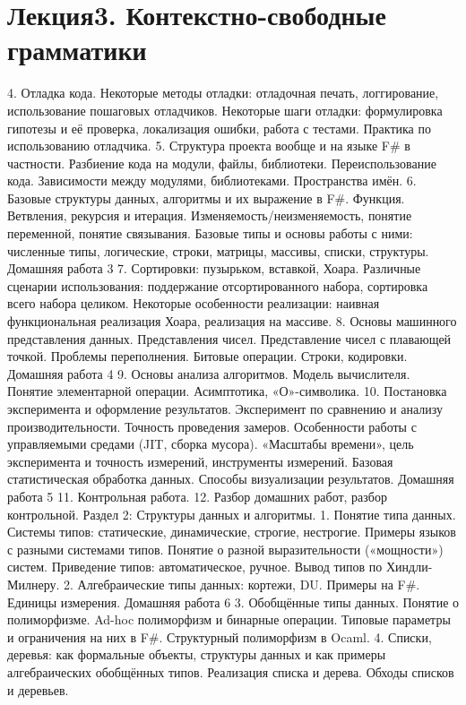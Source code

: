 \section{Лекция3. Контекстно-свободные грамматики}

    4. Отладка кода. Некоторые методы отладки: отладочная печать, логгирование, использование пошаговых отладчиков. Некоторые шаги отладки: формулировка гипотезы и её проверка, локализация ошибки, работа с тестами. Практика по использованию отладчика.
    5. Структура проекта вообще и на языке F# в частности. Разбиение кода на модули, файлы, библиотеки. Переиспользование кода. Зависимости между модулями, библиотеками. Пространства имён.
    6. Базовые структуры данных, алгоритмы и их выражение в F#. Функция. Ветвления, рекурсия и итерация. Изменяемость/неизменяемость, понятие переменной, понятие связывания. Базовые типы и основы работы с ними: численные типы, логические, строки, матрицы, массивы, списки, структуры. 
Домашняя работа 3
    7. Сортировки: пузырьком, вставкой, Хоара. Различные сценарии использования: поддержание отсортированного набора, сортировка всего набора целиком. Некоторые особенности реализации: наивная функциональная реализация Хоара, реализация на массиве.
    8. Основы машинного представления данных. Представления чисел. Представление чисел с плавающей точкой. Проблемы переполнения. Битовые операции. Строки, кодировки.
Домашняя работа 4
    9. Основы анализа алгоритмов. Модель вычислителя. Понятие элементарной операции. Асимптотика, «О»-символика.
    10. Постановка эксперимента и оформление результатов. Эксперимент по сравнению и анализу производительности.  Точность проведения замеров. Особенности работы с управляемыми средами (JIT, сборка мусора). «Масштабы времени», цель эксперимента и точность измерений, инструменты измерений. Базовая статистическая обработка данных. Способы визуализации результатов.  
Домашняя работа 5
    11. Контрольная работа.
    12. Разбор домашних работ, разбор контрольной.
Раздел 2: Структуры данных и алгоритмы.
    1. Понятие типа данных. Системы типов: статические, динамические, строгие, нестрогие. Примеры языков с разными системами типов. Понятие о разной выразительности («мощности») систем. Приведение типов: автоматическое, ручное. Вывод типов по Хиндли-Милнеру.
    2. Алгебраические типы данных: кортежи, DU. Примеры на F#. Единицы измерения.
Домашняя работа 6
    3. Обобщённые типы данных. Понятие о полиморфизме. Ad-hoc полиморфизм и бинарные операции. Типовые параметры и ограничения на них в F#. Структурный полиморфизм в Ocaml.
    4. Списки, деревья: как формальные объекты, структуры данных и как примеры алгебраических обобщённых типов. Реализация списка и дерева. Обходы списков и деревьев. 

